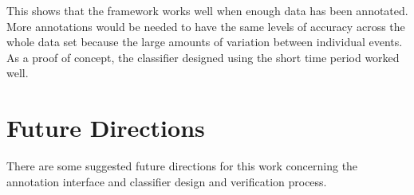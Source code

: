This shows that the framework works well when enough data has been annotated. More annotations would be needed to have the same levels of accuracy across the whole data set because the large amounts of variation between individual events. As a proof of concept, the classifier designed using the short time period worked well. 


\section{Future Directions}

There are some suggested future directions for this work concerning the annotation interface and classifier design and verification process. 



